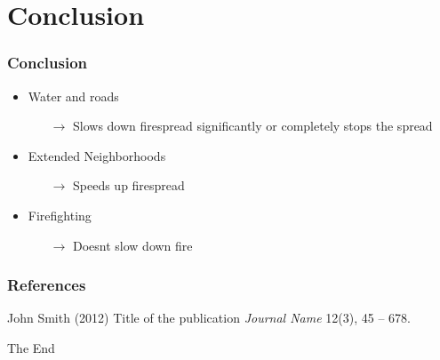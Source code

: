 \documentclass{beamer}
\begin{document}
\section{Conclusion} 

\begin{frame}
\frametitle{Conclusion}
\begin{itemize}
\item{Water and roads}
\pause 
\begin{itemize}
\item[$\rightarrow$] Slows down firespread significantly or completely stops the spread
\end{itemize}
\pause 
\item{Extended Neighborhoods}
\pause 
\begin{itemize}
\item[$\rightarrow$]  Speeds up firespread
\end{itemize}
\pause
\item{Firefighting}
\pause 
\begin{itemize}
\item[$\rightarrow$]  Doesnt slow down fire
\end{itemize}
\end{itemize}
\end{frame}



\begin{frame}
\frametitle{References}
\footnotesize{
\begin{thebibliography}{99} %
 John Smith (2012)
\newblock Title of the publication
\newblock \emph{Journal Name} 12(3), 45 -- 678.
\end{thebibliography}
}
\end{frame}


\begin{frame}
\Huge{\centerline{The End}}
\end{frame}

\end{document}
